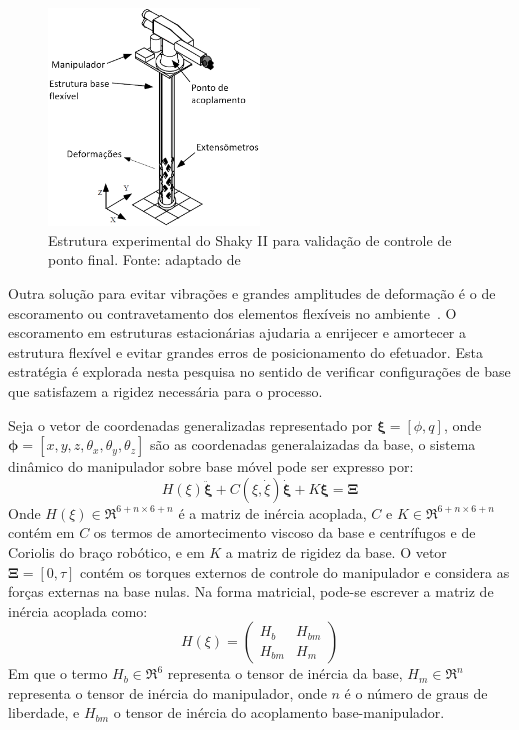 \begin{figure}[h]
	\centering 
 	\includegraphics[width=0.50\textwidth]{figs/shaky}
 	\caption[Estrutura experimental do Shaky II]{Estrutura experimental do Shaky II para validação de
 	controle de ponto final. Fonte: adaptado de \cite{mavroidis1997optimal}}
 	\label{fig::shaky}
\end{figure}

Outra solução para evitar vibrações e grandes amplitudes de deformação é o
de escoramento ou contravetamento dos elementos flexíveis no
ambiente~\cite{lew1994bracing}. O escoramento em estruturas estacionárias
ajudaria a enrijecer e amortecer a estrutura flexível e evitar grandes erros de
posicionamento do efetuador. Esta estratégia é explorada nesta pesquisa no
sentido de verificar configurações de base que satisfazem a rigidez necessária para o
processo.

Seja o vetor de coordenadas generalizadas representado por $\boldsymbol{\xi} =
[\phi, q]$, onde $\boldsymbol{\phi} = [x, y, z, \theta_x, \theta_y, \theta_z]$
são as coordenadas generalaizadas da base, o sistema dinâmico do manipulador sobre base móvel pode
ser expresso por:
%
\begin{equation}
	H(\xi) \ddot{\boldsymbol{\xi}} + C(\xi , \dot{\xi}) \dot{\boldsymbol{\xi}} + K
	\boldsymbol{\xi} = \boldsymbol{\Xi}
\end{equation}
%
Onde $H(\xi) \in \Re^{6+n \times 6+n}$ é a matriz de inércia acoplada, $C$ e $K
\in \Re^{6+n \times 6+n}$ contém em $C$ os termos de amortecimento viscoso da
base e centrífugos e de Coriolis do braço robótico, e em $K$ a matriz de rigidez
da base.
O vetor $\boldsymbol{\Xi} = [0, \tau]$ contém os torques externos de controle do
manipulador e considera as forças externas na base nulas. Na forma matricial,
pode-se escrever a matriz de inércia acoplada como:
%
\begin{equation}
	H(\xi) = \begin{pmatrix}
			H_b 	&	H_{bm} \\ 
			H_{bm}	&	H_m
\end{pmatrix}
\end{equation}
%
Em que o termo $H_b \in \Re^{6}$ representa o tensor de inércia da base, $H_m
\in \Re^{n}$ representa o tensor de inércia do manipulador, onde $n$ é o número
de graus de liberdade, e $H_{bm}$ o tensor de inércia do acoplamento
base-manipulador.


